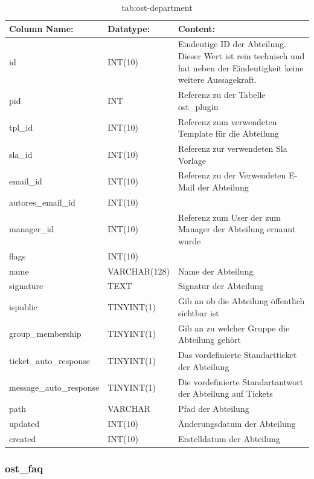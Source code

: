 \begin{table}[h]
	\begin{tabular}{|p{3.5cm}|p{4cm}|p{7.2cm}|}
		\hline
		\textbf{Column Name:} & \textbf{Datatype:} & \textbf{Content:}\\
		\hline
		id & INT(10) & Eindeutige ID der Abteilung. Dieser Wert ist rein technisch und hat  neben der Eindeutigkeit keine weitere 
		Aussagekraft.\\
		\hline
		pid & INT & Referenz zu der Tabelle ost\_plugin \\
		\hline
		tpl\_id & INT(10) & Referenz zum verwendeten Template für die Abteilung\\
		\hline
		sla\_id & INT(10) & Referenz zur verwendeten Sla Vorlage\\
		\hline
		email\_id & INT(10) & Referenz zu der Verwendeten E-Mail der Abteilung\\
		\hline
		autores\_email\_id & INT(10) & \\
		\hline
		manager\_id & INT(10) & Referenz zum User der zum Manager der Abteilung ernannt wurde\\
		\hline
		flags & INT(10) & \\
		\hline
		name & VARCHAR(128) & Name der Abteilung \\
		\hline
		signature & TEXT & Signatur der Abteilung \\
		\hline
		ispublic & TINYINT(1) & Gib an ob die Abteilung öffentlich sichtbar ist \\
		\hline
		group\_membership & TINYINT(1) & Gib an zu welcher Gruppe die Abteilung gehört \\
		\hline
		ticket\_auto\_response & TINYINT(1) & Das vordefinierte Standartticket der Abteilung \\
		\hline
		message\_auto\_response & TINYINT(1) & Die vordefinierte Standartantwort der Abteilung auf Tickets \\
		\hline
		path & VARCHAR & Pfad der Abteilung\\
		\hline
		updated & INT(10) & Änderungsdatum der Abteilung\\
		\hline
		created & INT(10) & Erstelldatum der Abteilung\\
		\hline
	\end{tabular}
	\caption{tab:ost-department}
\end{table}
\label{tab:ost_department}


\subsubsection{ost\_faq}

